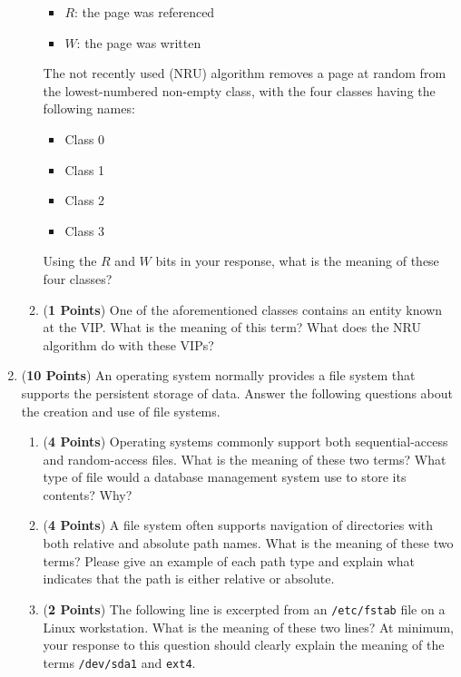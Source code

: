 \documentclass[12pt,epsf,psfig,graphics]{article}
\begin{document}
\begin{enumerate}
\begin{enumerate}
      \begin{itemize} 
        \item $R$: the page was referenced 
        \item $W$: the page was written
      \end{itemize}
  
    The not recently used (NRU) algorithm removes a page at random from the lowest-numbered non-empty class, with the
    four classes having the following names:

    \begin{itemize}
      \item Class 0
      \item Class 1
      \item Class 2
      \item Class 3
    \end{itemize}
    
    Using the $R$ and $W$ bits in your response, what is the meaning of these four classes?

    \item ({\bf 1 Points}) One of the aforementioned classes contains an entity known at the VIP.  What is the meaning
      of this term? What does the NRU algorithm do with these VIPs?

  \end{enumerate}

  \newpage
  
\item ({\bf 10 Points}) An operating system normally provides a file system that supports the persistent storage of
  data.  Answer the following questions about the creation and use of file systems.

  \begin{enumerate}

    \item ({\bf 4 Points}) Operating systems commonly support both sequential-access and random-access files.  What is
      the meaning of these two terms?  What type of file would a database management system use to store its contents?
      Why?

    \item ({\bf 4 Points}) A file system often supports navigation of directories with both relative and absolute path
      names.  What is the meaning of these two terms?  Please give an example of each path type and explain what
      indicates that the path is either relative or absolute.

    \item ({\bf 2 Points})  The following line is excerpted from an {\tt /etc/fstab} file on a Linux workstation.  What
      is the meaning of these two lines? At minimum, your response to this question should clearly explain the meaning
      of the terms {\tt /dev/sda1} and {\tt ext4}. \\


\end{enumerate}
\end{enumerate}
\end{document}
